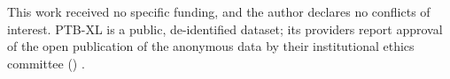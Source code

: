 This work received no specific funding, and the author declares no conflicts of interest. PTB-XL is a public,
de-identified dataset; its providers report approval of the open publication of the anonymous data by their
institutional ethics committee (\ptbxlEthicsRef) \cite{ptbxl103}.
